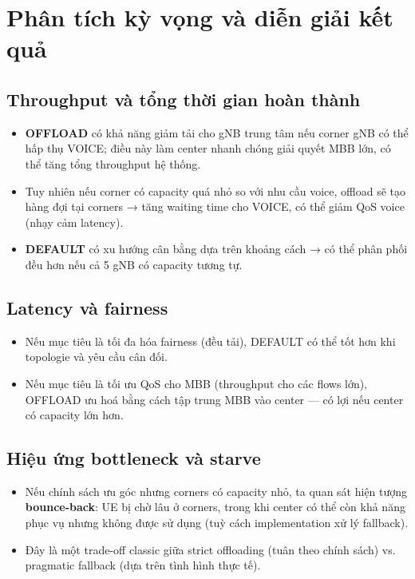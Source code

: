 \section{Phân tích kỳ vọng và diễn giải kết quả}

\subsection{Throughput và tổng thời gian hoàn thành}
\begin{itemize}
\item \textbf{OFFLOAD} có khả năng giảm tải cho gNB trung tâm nếu corner gNB có thể hấp thụ VOICE; điều này làm center nhanh chóng giải quyết MBB lớn, có thể tăng tổng throughput hệ thống.
\item Tuy nhiên nếu corner có capacity quá nhỏ so với nhu cầu voice, offload sẽ tạo hàng đợi tại corners → tăng waiting time cho VOICE, có thể giảm QoS voice (nhạy cảm latency).
\item \textbf{DEFAULT} có xu hướng cân bằng dựa trên khoảng cách → có thể phân phối đều hơn nếu cả 5 gNB có capacity tương tự.
\end{itemize}

\subsection{Latency và fairness}
\begin{itemize}
\item Nếu mục tiêu là tối đa hóa fairness (đều tải), DEFAULT có thể tốt hơn khi topologie và yêu cầu cân đối.
\item Nếu mục tiêu là tối ưu QoS cho MBB (throughput cho các flows lớn), OFFLOAD ưu hoá bằng cách tập trung MBB vào center — có lợi nếu center có capacity lớn hơn.
\end{itemize}

\subsection{Hiệu ứng bottleneck và starve}
\begin{itemize}
\item Nếu chính sách ưu góc nhưng corners có capacity nhỏ, ta quan sát hiện tượng \textbf{bounce-back}: UE bị chờ lâu ở corners, trong khi center có thể còn khả năng phục vụ nhưng không được sử dụng (tuỳ cách implementation xử lý fallback).
\item Đây là một trade-off classic giữa strict offloading (tuân theo chính sách) vs. pragmatic fallback (dựa trên tình hình thực tế).
\end{itemize}
